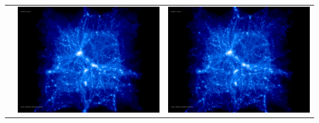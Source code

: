 \begin{itemize}
\begin{table}[p]
\begin{tabular}{l|c|c}
 & \includegraphics[scale=0.075]{r256/h70/red_st14_log2/197.jpg} & \includegraphics[scale=0.075]{r256/h100/red_st14_log2/197.jpg} \\

\end{tabular}
\end{table}
\end{itemize}
